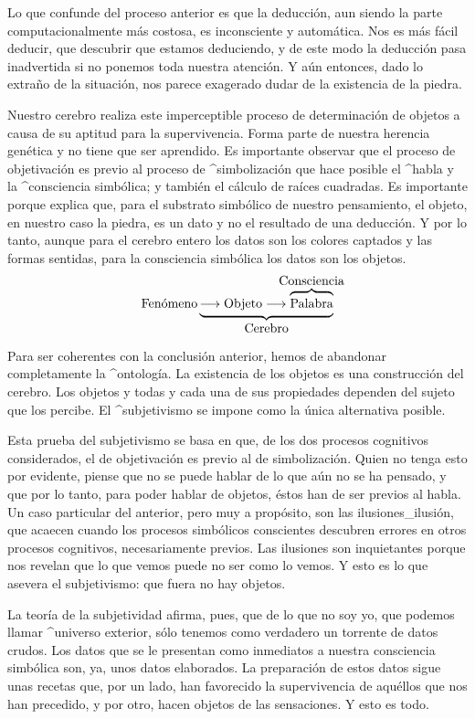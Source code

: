 Lo que confunde del proceso anterior es que la deducción, aun siendo la
parte computacionalmente más costosa, es inconsciente y automática. Nos
es más fácil deducir, que descubrir que estamos deduciendo, y de este
modo la deducción pasa inadvertida si no ponemos toda nuestra atención.
Y aún entonces, dado lo extraño de la situación, nos parece exagerado
dudar de la existencia de la piedra.

Nuestro cerebro realiza este imperceptible proceso de determinación de
objetos a causa de su aptitud para la supervivencia. Forma parte de
nuestra herencia genética y no tiene que ser aprendido. Es importante
observar que el proceso de objetivación es previo al proceso de
^{simbolización} que hace posible el ^{habla} y la ^{consciencia}
simbólica; y también el cálculo de raíces cuadradas. Es importante
porque explica que, para el substrato simbólico de nuestro pensamiento,
el objeto, en nuestro caso la piedra, es un dato y no el resultado de
una deducción. Y por lo tanto, aunque para el cerebro entero los datos
son los colores captados y las formas sentidas, para la consciencia
simbólica los datos son los objetos.
$$\hbox{Fenómeno} \underbrace{\longrightarrow \hbox{Objeto}
 \longrightarrow
 \overbrace{\hbox{\strut Palabra}}^{\hbox to 0pt{\hss
  Consciencia\hss}}}_{\hbox{Cerebro}}$$


Para ser coherentes con la conclusión anterior, hemos de abandonar
completamente la ^{ontología}. La existencia de los objetos es una
construcción del cerebro. Los objetos y todas y cada una de sus
propiedades dependen del sujeto que los percibe. El ^{subjetivismo} se
impone como la única alternativa posible.

Esta prueba del subjetivismo se basa en que, de los dos procesos
cognitivos considerados, el de objetivación es previo al de
simbolización. Quien no tenga esto por evidente, piense que no se puede
hablar de lo que aún no se ha pensado, y que por lo tanto, para poder
hablar de objetos, éstos han de ser previos al habla. Un caso particular
del anterior, pero muy a propósito, son las ilusiones_{ilusión}, que
acaecen cuando los procesos simbólicos conscientes descubren errores en
otros procesos cognitivos, necesariamente previos. Las ilusiones son
inquietantes porque nos revelan que lo que vemos puede no ser como lo
vemos. Y esto es lo que asevera el subjetivismo: que fuera no hay
objetos.

La teoría de la subjetividad afirma, pues, que de lo que no soy yo, que
podemos llamar ^{universo} exterior, sólo tenemos como verdadero un
torrente de datos crudos. Los datos que se le presentan como inmediatos
a nuestra consciencia simbólica son, ya, unos datos elaborados. La
preparación de estos datos sigue unas recetas que, por un lado, han
favorecido la supervivencia de aquéllos que nos han precedido, y por
otro, hacen objetos de las sensaciones. Y esto es todo.


